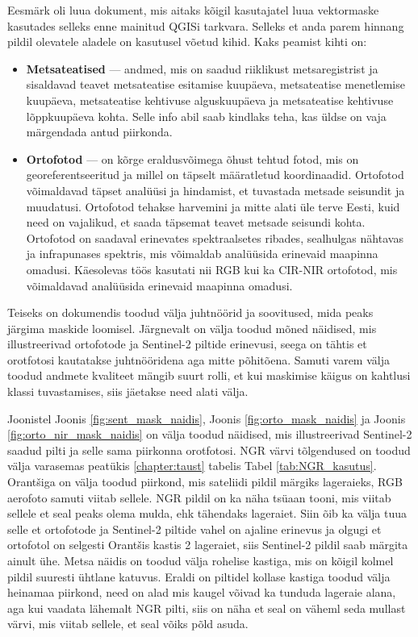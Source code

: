 Eesmärk oli luua dokument, mis aitaks kõigil kasutajatel luua vektormaske kasutades selleks enne mainitud QGISi tarkvara. Selleks et anda parem hinnang pildil olevatele aladele on kasutusel võetud kihid. Kaks peamist kihti on:
\begin{itemize}[topsep=1pt,itemsep=1ex,partopsep=1ex,parsep=1ex]
    \item \textbf{Metsateatised} --- andmed, mis on saadud riiklikust metsaregistrist ja sisaldavad teavet metsateatise esitamise kuupäeva, metsateatise menetlemise kuupäeva, metsateatise kehtivuse alguskuupäeva ja metsateatise kehtivuse lõppkuupäeva kohta. Selle info abil saab kindlaks teha, kas üldse on vaja märgendada antud piirkonda.
    \item \textbf{Ortofotod} --- on kõrge eraldusvõimega õhust tehtud fotod, mis on georeferentseeritud ja millel on täpselt määratletud koordinaadid. Ortofotod võimaldavad täpset analüüsi ja hindamist, et tuvastada metsade seisundit ja muudatusi. Ortofotod tehakse harvemini ja mitte alati üle terve Eesti, kuid need on vajalikud, et saada täpsemat teavet metsade seisundi kohta. Ortofotod on saadaval erinevates spektraalsetes ribades, sealhulgas nähtavas ja infrapunases spektris, mis võimaldab analüüsida erinevaid maapinna omadusi. Käesolevas töös kasutati nii RGB kui ka CIR-NIR ortofotod, mis võimaldavad analüüsida erinevaid maapinna omadusi. 
\end{itemize}

Teiseks on dokumendis toodud välja juhtnöörid ja soovitused, mida peaks järgima
maskide loomisel. Järgnevalt on välja toodud mõned näidised, mis illustreerivad ortofotode ja Sentinel-2 piltide erinevusi, seega on tähtis et orotfotosi kautatakse juhtnööridena aga mitte põhitõena. Samuti varem välja toodud andmete kvaliteet mängib suurt rolli, et kui maskimise käigus on kahtlusi klassi tuvastamises, siis jäetakse need alati välja.

Joonistel Joonis \ref{fig:sent_mask_naidis}, Joonis \ref{fig:orto_mask_naidis} ja Joonis \ref{fig:orto_nir_mask_naidis} on välja toodud näidised, mis illustreerivad Sentinel-2 saadud pilti ja selle sama piirkonna orotfotosi. NGR värvi tõlgendused on toodud välja varasemas peatükis \ref{chapter:taust} tabelis Tabel \ref{tab:NGR_kasutus}. Orantšiga on välja toodud piirkond, mis  sateliidi pildil märgiks lageraieks, RGB aerofoto samuti viitab sellele. NGR pildil on ka näha tsüaan tooni, mis viitab sellele et seal peaks olema mulda, ehk tähendaks lageraiet. Siin õib ka välja tuua selle et ortofotode ja Sentinel-2 piltide vahel on ajaline erinevus ja olgugi et ortofotol on selgesti Orantšis kastis 2 lageraiet, siis Sentinel-2 pildil saab märgita ainult ühe. Metsa näidis on toodud välja rohelise kastiga, mis on kõigil kolmel pildil suuresti ühtlane katuvus. Eraldi on piltidel kollase kastiga toodud välja heinamaa piirkond, need on alad mis kaugel võivad ka tunduda lageraie alana, aga kui vaadata lähemalt NGR pilti, siis on näha et seal on väheml seda mullast värvi, mis viitab sellele, et seal võiks põld asuda.

